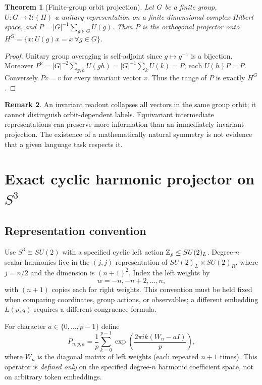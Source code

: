 \documentclass[11pt,a4paper]{article}
\theoremstyle{plain}\newtheorem{theorem}{Theorem}[section]\newtheorem{proposition}[theorem]{Proposition}\newtheorem{lemma}[theorem]{Lemma}
\theoremstyle{definition}\newtheorem{definition}[theorem]{Definition}\newtheorem{remark}[theorem]{Remark}\newtheorem{counterexample}[theorem]{Counterexample}
\begin{document}
\begin{theorem}[Finite-group orbit projection]\label{th:group}
Let $G$ be a finite group, $U:G\to\mathcal U(H)$ a unitary representation on a finite-dimensional complex Hilbert space, and $P=|G|^{-1}\sum_{g\in G}U(g)$. Then $P$ is the orthogonal projector onto $H^G=\{x:U(g)x=x\ \forall g\in G\}$.
\end{theorem}
\begin{proof}
Unitary group averaging is self-adjoint since $g\mapsto g^{-1}$ is a bijection. Moreover
$P^2=|G|^{-2}\sum_{g,h}U(gh)=|G|^{-1}\sum_k U(k)=P$; each $U(h)P=P$. Conversely $Pv=v$ for every invariant vector $v$. Thus the range of $P$ is exactly $H^G$.
\end{proof}
\begin{remark}
An invariant readout collapses all vectors in the same group orbit; it cannot distinguish orbit-dependent labels. Equivariant intermediate representations can preserve more information than an immediately invariant projection. The existence of a mathematically natural symmetry is not evidence that a given language task respects it.
\end{remark}

\section{Exact cyclic harmonic projector on \texorpdfstring{$S^3$}{S3}}
\subsection{Representation convention}
Use $S^3\cong SU(2)$ with a specified cyclic left action $\mathbb Z_p\le SU(2)_L$. Degree-$n$ scalar harmonics live in the $(j,j)$ representation of $SU(2)_L\times SU(2)_R$, where $j=n/2$ and the dimension is $(n+1)^2$. Index the left weights by
\begin{equation}
 w=-n,-n+2,\ldots,n,
\end{equation}
with $(n+1)$ copies each for right weights. This convention must be held fixed when comparing coordinates, group actions, or observables; a different embedding $L(p,q)$ requires a different congruence formula.

For character $a\in\{0,\ldots,p-1\}$ define
\begin{equation}\label{eq:cyc}
 P_{n,p,a}=\frac1p\sum_{k=0}^{p-1}\exp\!\left(\frac{2\pi i k(W_n-aI)}p\right),
\end{equation}
where $W_n$ is the diagonal matrix of left weights (each repeated $n+1$ times). This operator is \emph{defined only} on the specified degree-$n$ harmonic coefficient space, not on arbitrary token embeddings.
\end{document}
